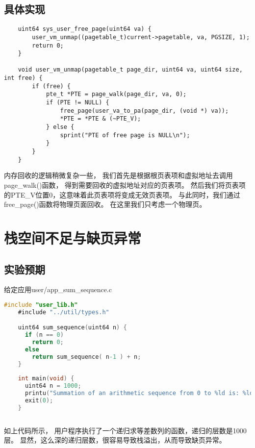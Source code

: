 \subsection{具体实现}

\begin{lstlisting}
    uint64 sys_user_free_page(uint64 va) {
        user_vm_unmap((pagetable_t)current->pagetable, va, PGSIZE, 1);
        return 0;
    }  
    
    void user_vm_unmap(pagetable_t page_dir, uint64 va, uint64 size, int free) {
        if (free) {
            pte_t *PTE = page_walk(page_dir, va, 0);
            if (PTE != NULL) {
                free_page(user_va_to_pa(page_dir, (void *) va));
                *PTE = *PTE & (~PTE_V);
            } else {
                sprint("PTE of free page is NULL\n");
            }
        }
    }    
\end{lstlisting}

内存回收的逻辑稍微复杂一些，
我们首先是根据根页表项和虚拟地址去调用page\_walk()函数，
得到需要回收的虚拟地址对应的页表项。
然后我们将页表项的PTE\_V位置0，这意味着此页表项将变成无效页表项。
与此同时，我们通过free\_page()函数将物理页面回收。
在这里我们只考虑一个物理页。

\section{栈空间不足与缺页异常}

\subsection{实验预期}

给定应用user/app\_sum\_sequence.c

\begin{lstlisting}[caption={用户态应用app\_sum\_sequence.c}, label={lst:app_sum_sequence}, language=C]
    #include "user_lib.h"
    #include "../util/types.h"

    uint64 sum_sequence(uint64 n) {
      if (n == 0)
        return 0;
      else
        return sum_sequence( n-1 ) + n;
    }
    
    int main(void) {
      uint64 n = 1000;
      printu("Summation of an arithmetic sequence from 0 to %ld is: %ld \n", n, sum_sequence(n) );
      exit(0);
    }
        
\end{lstlisting}

如上代码所示，
用户程序执行了一个递归求等差数列的函数，递归的层数是1000层。
显然，这么深的递归层数，很容易导致栈溢出，从而导致缺页异常。

